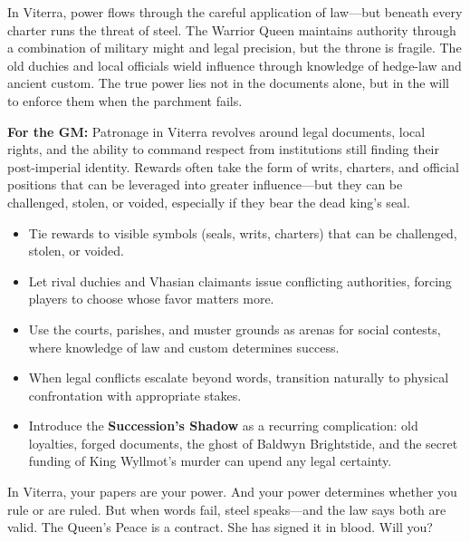 \begin{itemize}[nosep]
\begin{tcolorbox}[colback=black!3,colframe=black!40!white,title={Patronage \& Power},breakable]
In Viterra, power flows through the careful application of law---but beneath every charter runs the threat of steel. The Warrior Queen maintains authority through a combination of military might and legal precision, but the throne is fragile. The old duchies and local officials wield influence through knowledge of hedge-law and ancient custom. The true power lies not in the documents alone, but in the will to enforce them when the parchment fails.

\textbf{For the GM:}  
Patronage in Viterra revolves around legal documents, local rights, and the ability to command respect from institutions still finding their post-imperial identity. Rewards often take the form of writs, charters, and official positions that can be leveraged into greater influence---but they can be challenged, stolen, or voided, especially if they bear the dead king's seal.
\begin{itemize}[nosep]
  \item Tie rewards to visible symbols (seals, writs, charters) that can be challenged, stolen, or voided.
  \item Let rival duchies and Vhasian claimants issue conflicting authorities, forcing players to choose whose favor matters more.
  \item Use the courts, parishes, and muster grounds as arenas for social contests, where knowledge of law and custom determines success.
  \item When legal conflicts escalate beyond words, transition naturally to physical confrontation with appropriate stakes.
  \item Introduce the \textbf{Succession's Shadow} as a recurring complication: old loyalties, forged documents, the ghost of Baldwyn Brightstide, and the secret funding of King Wyllmot's murder can upend any legal certainty.
\end{itemize}
In Viterra, your papers are your power. And your power determines whether you rule or are ruled. But when words fail, steel speaks---and the law says both are valid. The Queen's Peace is a contract. She has signed it in blood. Will you?
\end{tcolorbox}


\end{itemize}
